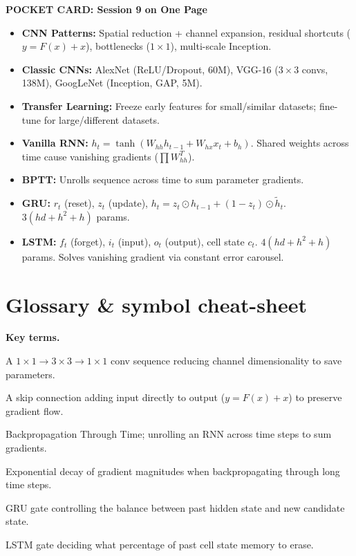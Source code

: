 \documentclass[a4paper,11pt]{article}
\begin{document}
\begin{keytake}
\textbf{POCKET CARD: Session 9 on One Page}
\begin{itemize}
  \item \textbf{CNN Patterns:} Spatial reduction + channel expansion, residual shortcuts ($y = F(x)+x$), bottlenecks ($1 \times 1$), multi-scale Inception.
  \item \textbf{Classic CNNs:} AlexNet (ReLU/Dropout, 60M), VGG-16 ($3 \times 3$ convs, 138M), GoogLeNet (Inception, GAP, 5M).
  \item \textbf{Transfer Learning:} Freeze early features for small/similar datasets; fine-tune for large/different datasets.
  \item \textbf{Vanilla RNN:} $h_t = \tanh(W_{hh} h_{t-1} + W_{hx} x_t + b_h)$. Shared weights across time cause vanishing gradients ($\prod W_{hh}^T$).
  \item \textbf{BPTT:} Unrolls sequence across time to sum parameter gradients.
  \item \textbf{GRU:} $r_t$ (reset), $z_t$ (update), $h_t = z_t \odot h_{t-1} + (1-z_t) \odot \tilde{h}_t$. $3(hd + h^2 + h)$ params.
  \item \textbf{LSTM:} $f_t$ (forget), $i_t$ (input), $o_t$ (output), cell state $c_t$. $4(hd + h^2 + h)$ params. Solves vanishing gradient via constant error carousel.
\end{itemize}
\end{keytake}

\section*{Glossary \& symbol cheat-sheet}
\noindent\textbf{Key terms.}
\begin{description}[leftmargin=8.5em,style=nextline,font=\normalfont\bfseries\color{navy}]
  \item[Bottleneck Block] A $1 \times 1 \to 3 \times 3 \to 1 \times 1$ conv sequence reducing channel dimensionality to save parameters.
  \item[Residual Connection] A skip connection adding input directly to output ($y = F(x) + x$) to preserve gradient flow.
  \item[BPTT] Backpropagation Through Time; unrolling an RNN across time steps to sum gradients.
  \item[Vanishing Gradient] Exponential decay of gradient magnitudes when backpropagating through long time steps.
  \item[Update Gate ($z_t$)] GRU gate controlling the balance between past hidden state and new candidate state.
  \item[Forget Gate ($f_t$)] LSTM gate deciding what percentage of past cell state memory to erase.
\end{description}
\end{document}
